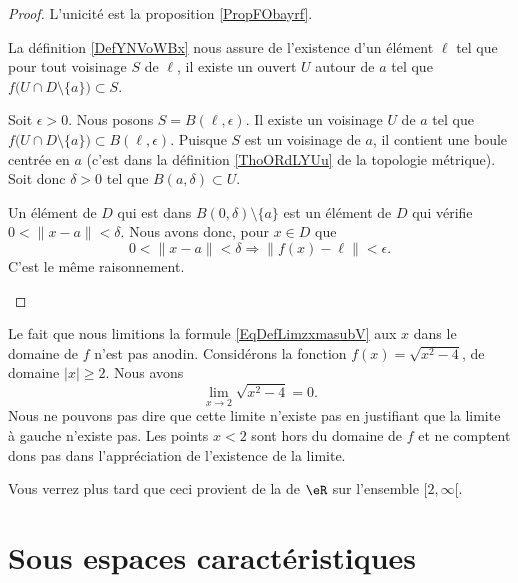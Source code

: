 \begin{proof}
	L'unicité est la proposition \ref{PropFObayrf}.

	\begin{subproof}
		\spitem[\( \Rightarrow\)]
		La définition \ref{DefYNVoWBx} nous assure de l'existence d'un élément \( \ell\) tel que pour tout voisinage \( S\) de \( \ell\), il existe un ouvert \( U\) autour de \( a\) tel que \( f\big( U\cap D\setminus\{ a \} \big)\subset S\).

		Soit \( \epsilon>0\). Nous posons \( S=B(\ell,\epsilon)\). Il existe un voisinage \( U\) de \( a\) tel que \( f\big( U\cap D\setminus\{ a \} \big)\subset B(\ell,\epsilon)\). Puisque \( S\) est un voisinage de \( a\), il contient une boule centrée en \( a\) (c'est dans la définition \ref{ThoORdLYUu} de la topologie métrique). Soit donc \( \delta>0\) tel que \( B(a,\delta)\subset U\).

		Un élément de \( D\) qui est dans \( B(0,\delta)\setminus \{ a \}\) est un élément de \( D\) qui vérifie \( 0<\| x-a \|<\delta\). Nous avons donc, pour \( x\in D\) que
		\begin{equation}
			0<\| x-a \|<\delta\Rightarrow \| f(x)-\ell \|<\epsilon.
		\end{equation}
		\spitem[\( \Leftarrow\)] C'est le même raisonnement.
	\end{subproof}
\end{proof}


\begin{remark}
	Le fait que nous limitions la formule \eqref{EqDefLimzxmasubV} aux \( x\) dans le domaine de \( f\) n'est pas anodin. Considérons la fonction \( f(x)=\sqrt{x^2-4}\), de domaine \( | x |\geq 2\). Nous avons
	\begin{equation}
		\lim_{x\to 2} \sqrt{x^2-4}=0.
	\end{equation}
	Nous ne pouvons pas dire que cette limite n'existe pas en justifiant que la limite à gauche n'existe pas. Les points \( x<2\) sont hors du domaine de \( f\) et ne comptent dons pas dans l'appréciation de l'existence de la limite.

	Vous verrez plus tard que ceci provient de la  de \( \eR\) sur l'ensemble \( \mathopen[ 2 , \infty [\).
\end{remark}

\section{Sous espaces caractéristiques}

